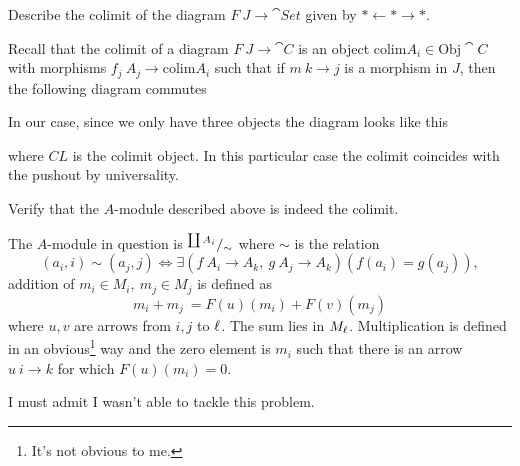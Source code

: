 \documentclass[12pt]{memoir}
\begin{document}
\begin{Ej}
    Describe the colimit of the diagram $F\: J\to\cat{Set}$ given by $\ast\leftarrow\ast\to\ast$.
\end{Ej}
\begin{ptcbr}
    Recall that the colimit of a diagram $F\: J\to\cat{C}$ is an object $\text{colim} A_i\in\text{Obj}\cat{C}$ with morphisms $f_j\: A_j\to\text{colim} A_i$ such that if $m\: k\to j$ is a morphism in $J$, then the following diagram commutes
\begin{center}
\end{center}
In our case, since we only have three objects the diagram looks like this
\begin{center}
\end{center}
where $CL$ is the colimit object. In this particular case the colimit coincides with the pushout by universality.
\end{ptcbr}

\begin{Ej}[1.4.F]
    Verify that the $A$-module described above is indeed the colimit.
\end{Ej}

The $A$-module in question is $\quot{\coprod A_i}{\sim}$ where $\sim$ is the relation 
$$(a_i,i)\sim (a_j,j)\iff \exists (f\: A_i\to A_k,\ g\: A_j\to A_k)(f(a_i)=g(a_j)),$$
addition of $m_i\in M_i,\ m_j\in M_j$ is defined as 
$$m_i+m_j\:= F(u)(m_i)+F(v)(m_j)$$
where $u,v$ are arrows from $i,j$ to $\ell$. The sum lies in $M_\ell$. Multiplication is defined in an obvious\footnote{It's not obvious to me.} way and the zero element is $m_i$ such that there is an arrow $u\: i\to k$ for which $F(u)(m_i)=0$.\par 
I must admit I wasn't able to tackle this problem. 
\end{document}
